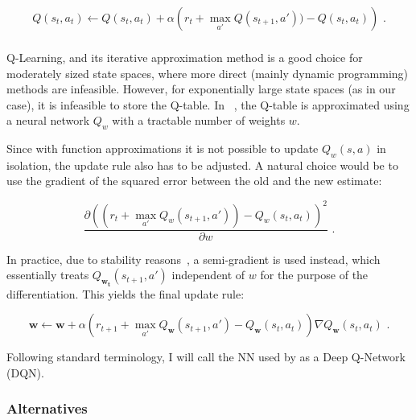 \begin{equation} \label{eq:q-learningUpdate}
Q(s_t,a_t) \leftarrow Q(s_t,a_t) + \alpha\left( r_t + \max_{a'} Q(s_{t+1}, a')) - Q(s_t,a_t)\right) \text{ .}
\end{equation}


\subsubsection{\DQL} \label{deepq-learning}


Q-Learning, and its iterative approximation method is a good choice for moderately sized state spaces, where more direct (mainly dynamic programming) methods are infeasible. However, for exponentially large state spaces (as in our case), it is infeasible to store the Q-table. In \DQL~\cite{mnih2013DQN}, the Q-table is approximated using a neural network $Q_w$ with a tractable number of weights $w$.

Since with function approximations it is not possible to update $Q_w(s, a)$ in isolation, the update rule also has to be adjusted. A natural choice would be to use the gradient of the squared error between the old and the new estimate:

$$\frac{\partial (( r_t + \max_{a'} Q_w(s_{t+1}, a')) - Q_w(s_t,a_t))^2}{\partial w} \text{ .}$$

In practice, due to stability reasons~\cite{barnard1993semigradient},  a semi-gradient is used instead, which essentially treats $Q_{\mathbf{w_t}}(s_{t+1}, a')$ independent of $w$ for the purpose of the differentiation. This yields the final update rule:


\begin{equation} \label{eq:deep-q-learning-update-with-semi-gradient}
\mathbf{w} \leftarrow \mathbf{w} + \alpha\left( r_{t+1}+ \max_{a'} Q_{\mathbf{w}}(s_{t+1}, a') - Q_{\mathbf{w}}(s_t,a_t)\right)\nabla Q_{\mathbf{w}}(s_{t}, a_t) \text{ .}
\end{equation}

Following standard terminology, I will call the NN used by \DQL as a Deep Q-Network (DQN).

\subsubsection{Alternatives}

